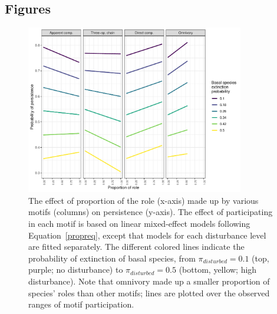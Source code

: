 \documentclass[12pt]{article}
\begin{document}
\begin{spacing}{2.0}
\section*{Figures}
    
            
    \begin{figure}[h!]
        \centering
        \includegraphics[width=0.85\textwidth]{figures/prop_lmer_allCS.pdf}
        \caption{The effect of proportion of the role (x-axis) made up by various motifs (columns) on persistence (y-axis). The effect of participating in each motif is based on linear mixed-effect models following Equation~\ref{propreq}, except that models for each  disturbance level are fitted separately. The different colored lines indicate the probability of extinction of basal species, from $\pi_{disturbed} = 0.1$ (top, purple; no disturbance) to $\pi_{disturbed} = 0.5$ (bottom, yellow; high disturbance). Note that omnivory made up a smaller proportion of species' roles than other motifs; lines are plotted over the observed ranges of motif participation.}
    \label{fig:prop_lmer_all}
    \end{figure}
        


\end{spacing}
\end{document}
